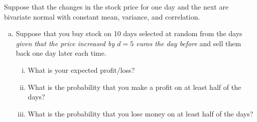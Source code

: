 \begin{frame}

  \begin{block}{\examplectd}
     Suppose that the changes in the stock price for one day and the next are bivariate normal with constant mean, variance, and correlation.  
 
    \begin{enumerate}[d)]
    \item Suppose that you buy stock on 10 days selected at random from the days \textit{given that the price increased by $d=5$ euros the day before} and sell them back one day later each time.
     \begin{enumerate}[i)]
        \item What is your expected profit/loss?
        \item What is the probability that you make a profit on at least half of the days?
        \item What is the probability that you lose money on at least half of the days?
      \end{enumerate}
    \end{enumerate}
  \end{block}
\end{frame}

